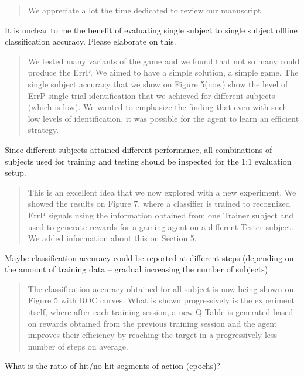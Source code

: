 \documentclass[journal,onecolumn,12pt]{IEEEtran}
\begin{document}
\begin{quotation}
{\color{blue}
We appreciate a lot the time dedicated to review our manuscript.
}
\end{quotation}


It is unclear to me the benefit of evaluating single subject to single subject offline classification accuracy. Please elaborate on this. 

\begin{quotation}
{\color{blue}
We tested many variants of the game and we found that not so many could produce the ErrP.  We aimed to have a simple solution, a simple game.  The single subject accuracy that we show on Figure 5(now) show the level of ErrP single trial identification that we achieved for different subjects (which is low).  We wanted to emphasize the finding that even with such low levels of identification, it was possible for the agent to learn an efficient strategy.
}
\end{quotation}

Since different subjects attained different performance, all combinations of subjects used for training and testing should be inspected for the 1:1 evaluation setup. 

\begin{quotation}
{\color{blue}
This is an excellent idea that we now explored with a new experiment.  We showed the results on Figure 7, where a classifier is trained to recognized ErrP signals using the information obtained from one Trainer subject and used to generate rewards for a gaming agent on a different Tester subject.  We added information about this on Section 5.
}
\end{quotation}

Maybe classification accuracy could be reported at different steps (depending on the amount of training data – gradual increasing the number of subjects)

\begin{quotation}
{\color{blue}
The classification accuracy obtained for all subject is now being shown on Figure 5 with ROC curves.  What is shown progressively is the experiment itself, where after each training session, a new Q-Table is generated based on rewards obtained from the previous training session and the agent improves their efficiency by reaching the target in a progressively less number of steps on average.  
}
\end{quotation}


What is the ratio of hit/no hit segments of action (epochs)?
\end{document}
